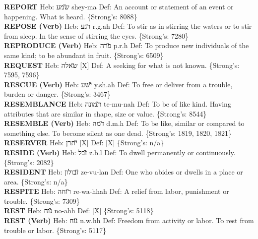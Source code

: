 {\textbf{REPORT} Heb: {\large\H שמע} shey-ma Def: An account or statement of an event or happening. What is heard. \{Strong's: 8088\}\hfill{}\\

\textbf{REPOSE (Verb)} Heb: {\large\H רגע} r.g.ah Def: To stir as in stirring the waters or to stir from sleep. In the sense of stirring the eyes. \{Strong's: 7280\}\hfill{}\\

\textbf{REPRODUCE (Verb)} Heb: {\large\H פרה} p.r.h Def: To produce new individuals of the same kind; to be abundant in fruit. \{Strong's: 6509\}\hfill{}\\

\textbf{REQUEST} Heb: {\large\H שאלה} {[}X{]} Def: A seeking for what is not known. \{Strong's: 7595, 7596\}\hfill{}\\

\textbf{RESCUE (Verb)} Heb: {\large\H ישע} y.sh.ah Def: To free or deliver from a trouble, burden or danger. \{Strong's: 3467\}\hfill{}\\

\textbf{RESEMBLANCE} Heb: {\large\H תמונה} te-mu-nah Def: To be of like kind. Having attributes that are similar in shape, size or value. \{Strong's: 8544\}\hfill{}\\

\textbf{RESEMBLE (Verb)} Heb: {\large\H דמה} d.m.h Def: To be like, similar or compared to something else. To become silent as one dead. \{Strong's: 1819, 1820, 1821\}\hfill{}\\

\textbf{RESERVER} Heb: {\large\H יתרן} {[}X{]} Def: {[}X{]} \{Strong's: n/a\}\hfill{}\\

\textbf{RESIDE (Verb)} Heb: {\large\H זבל} z.b.l Def: To dwell permanently or continuously. \{Strong's: 2082\}\hfill{}\\

\textbf{RESIDENT} Heb: {\large\H זבולון} ze-vu-lan Def: One who abides or dwells in a place or area. \{Strong's: n/a\}\hfill{}\\

\textbf{RESPITE} Heb: {\large\H רוחה} re-wa-hhah Def: A relief from labor, punishment or trouble. \{Strong's: 7309\}\hfill{}\\

\textbf{REST} Heb: {\large\H נוח} no-ahh Def: {[}X{]} \{Strong's: 5118\}\hfill{}\\

\textbf{REST (Verb)} Heb: {\large\H נוח} n.w.hh Def: Freedom from activity or labor. To rest from trouble or labor. \{Strong's: 5117\}\hfill{}\\

}
